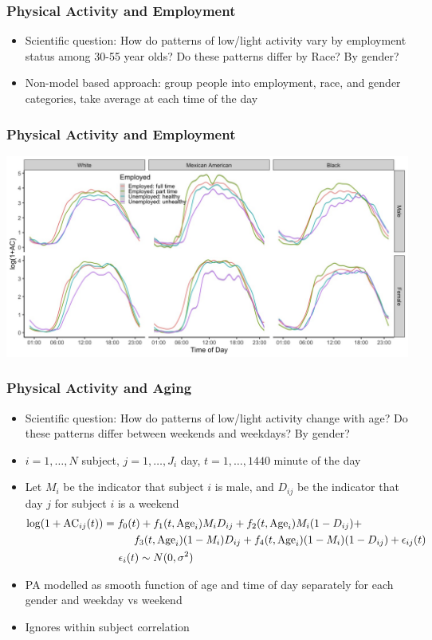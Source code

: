 \documentclass[10pt]{beamer}\usepackage[]{graphicx}\usepackage[]{color}
\begin{document}
\begin{frame}
\frametitle{Physical Activity and Employment}
\begin{itemize}
\item Scientific question: How do patterns of low/light activity vary by employment status among 30-55 year olds? Do these patterns differ by Race? By gender?
\item Non-model based approach: group people into employment, race, and gender categories, take average at each time of the day
\end{itemize}
\end{frame}

\begin{frame}
\frametitle{Physical Activity and Employment}
\includegraphics[width=\textwidth]{PA_profiles_by_race_employment_age_30_55_smooth}
\end{frame}





\begin{frame}
\frametitle{Physical Activity and Aging}
\begin{itemize}
\item Scientific question: How do patterns of low/light activity change with age? Do these patterns differ between weekends and weekdays? By gender? \pause
\item $i = 1,\ldots,N$ subject, $j = 1,\ldots, J_i$ day, $t = 1,\ldots,1440$ minute of the day
\item Let $M_i$ be the indicator that subject $i$ is male, and $D_{ij}$ be the indicator that day $j$ for subject $i$ is a weekend
\scriptsize
\begin{align*}
\log(1+\text{AC}_{ij}(t)) &= f_0(t) + f_1(t, \text{Age}_i)M_iD_{ij} + f_2(t,\text{Age}_i)M_i(1-D_{ij}) + \\
& \hspace{1cm}  f_3(t, \text{Age}_i)(1-M_i)D_{ij} + f_4(t,\text{Age}_i)(1-M_i)(1-D_{ij})+ \epsilon_{ij}(t) \\ 
&  \hspace{0.5cm} \epsilon_i(t) \sim N(0,\sigma^2)
\end{align*} 
\normalsize
\item PA modelled as smooth function of age and time of day separately for each gender and weekday vs weekend
\item Ignores within subject correlation
\end{itemize}
\end{frame}
\end{document}
